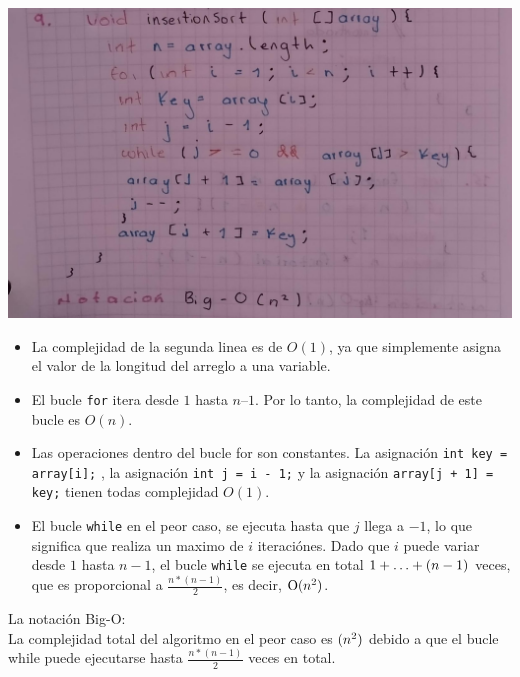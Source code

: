 \documentclass[a4paper,onecolumn,10pt]{article}
\begin{document}
\includegraphics[width=1\linewidth]{imagenes/punto 9.jpeg}
\\ 

\begin{itemize}
    
    \item La complejidad de la segunda linea es de $O(1)$, ya que simplemente asigna el valor de la longitud del arreglo a una variable.
   
    \item El bucle \texttt{for} itera desde $1$ hasta $n – 1$. Por lo tanto, la complejidad de este bucle es $O(n)$.
    
    \item Las operaciones dentro del bucle for son constantes. La asignación \texttt{int key = array[i];} , la asignación \texttt{int j = i - 1;} y la asignación \texttt{array[j + 1] = key;} tienen todas complejidad $O(1)$.\\
   
    \item El bucle \texttt{while} en el peor caso, se ejecuta hasta que $j$ llega a $-1$, lo que significa que realiza un maximo de $i$ iteraciónes. Dado que $i$ puede variar desde $1$ hasta $n - 1$, el bucle \texttt{while} se ejecuta en total $\text 1+\ldots + (n - 1)$ veces, que es proporcional a $\frac{n*(n-1)}{2}$, es decir, $\text O(n^2)$.
    
\end{itemize}

La notación Big-O: \\

La complejidad total del algoritmo en el peor caso es $\text (n^2)$ debido a que el bucle while puede ejecutarse hasta  $\frac{n*(n-1)}{2}$ veces en total.
\end{document}
